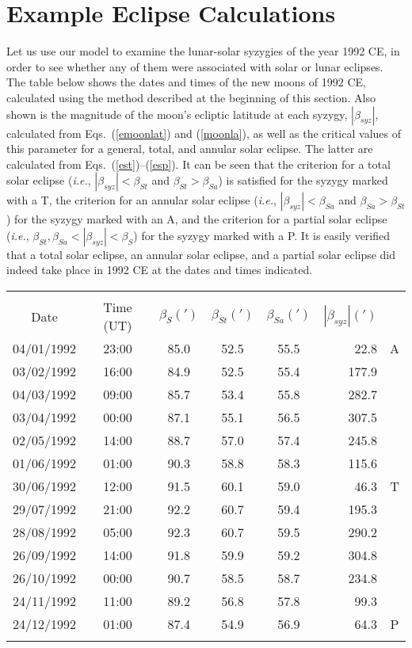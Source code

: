 \section{Example Eclipse Calculations}
Let us use our model to examine the lunar-solar syzygies of the year
1992 CE, in order to see whether any of them were associated with solar or
lunar eclipses. The table below shows the dates and times of the new moons
of 1992 CE, calculated using the method described at the beginning of
this section. Also shown is the magnitude of the moon's ecliptic latitude
at each syzygy, $|\beta_{syz}|$, calculated from Eqs.~(\ref{emoonlat}) and
(\ref{moonla}), as well as the critical values of
this parameter for a general,  total, and annular solar eclipse. The latter are calculated from
Eqs.~(\ref{est})--(\ref{esp}). It can be seen that
the criterion for a total solar eclipse ({\em i.e.}, $|\beta_{syz}|< \beta_{St}$ and $\beta_{St}>\beta_{Sa}$) is satisfied for the syzygy marked with a T,  the criterion for an annular solar eclipse ({\em i.e.}, $|\beta_{syz}|< \beta_{Sa}$ and $\beta_{Sa}>\beta_{St}$) for the syzygy marked with an A,
and
the criterion for a partial solar eclipse  ({\em i.e.}, $\beta_{St},\beta_{Sa}<|\beta_{syz}|< \beta_{S}$)  for the syzygy marked with a P. It is easily verified
that a total solar eclipse, an annular solar eclipse, and a partial solar eclipse did indeed
take place in 1992 CE at the dates and times indicated.\\
\begin{tabular}{cccccrc}
&&&&&&\\
Date & Time (UT) & $\beta_{S}(')$ & $\beta_{St}(')$ & $\beta_{Sa}(')$ & $|\beta_{syz}|(')$\\\hline
04/01/1992  &23:00   &85.0   &52.5   &55.5   &22.8  &A\\
03/02/1992  &16:00   &84.9   &52.5   &55.4  &177.9  & \\
04/03/1992  &09:00   &85.7   &53.4   &55.8  &282.7  & \\
03/04/1992  &00:00   &87.1   &55.1   &56.5  &307.5  & \\
02/05/1992  &14:00   &88.7   &57.0   &57.4  &245.8  & \\
01/06/1992  &01:00   &90.3   &58.8   &58.3  &115.6  & \\
30/06/1992  &12:00   &91.5   &60.1   &59.0   &46.3  &T\\
29/07/1992  &21:00   &92.2   &60.7   &59.4  &195.3  & \\
28/08/1992  &05:00   &92.3   &60.7   &59.5  &290.2   &\\
26/09/1992  &14:00   &91.8   &59.9   &59.2  &304.8   &\\
26/10/1992  &00:00   &90.7   &58.5   &58.7  &234.8   &\\
24/11/1992  &11:00   &89.2   &56.8   &57.8   &99.3   &\\
24/12/1992  &01:00   &87.4   &54.9   &56.9   &64.3  &P\\
&&&&&&\\
\end{tabular}

